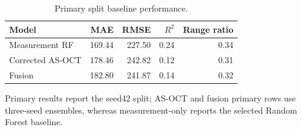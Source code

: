 \begin{table}[t]
\centering
\caption{Primary split baseline performance.}
\label{tab:primary_baselines}
\begin{tabular}{lrrrr}
\toprule
Model & MAE & RMSE & $R^2$ & Range ratio \\
\midrule
Measurement RF & 169.44 & 227.50 & 0.24 & 0.34 \\
Corrected AS-OCT & 178.46 & 242.82 & 0.12 & 0.31 \\
Fusion & 182.80 & 241.87 & 0.14 & 0.32 \\
\bottomrule
\end{tabular}
\footnotesize Primary results report the seed42 split; AS-OCT and fusion primary rows use three-seed ensembles, whereas measurement-only reports the selected Random Forest baseline.
\end{table}
